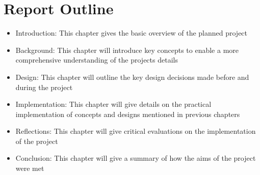\section{Report Outline}
\begin{itemize}
    \item Introduction: This chapter gives the basic overview of the planned project
    \item Background: This chapter will introduce key concepts to enable a more comprehensive understanding of the projects details
    \item Design: This chapter will outline the key design decisions made before and during the project
    \item Implementation: This chapter will give details on the practical implementation of concepts and designs mentioned in previous chapters
    \item Reflections: This chapter will give critical evaluations on the implementation of the project
    \item Conclusion: This chapter will give a summary of how the aims of the project were met 
\end{itemize}

